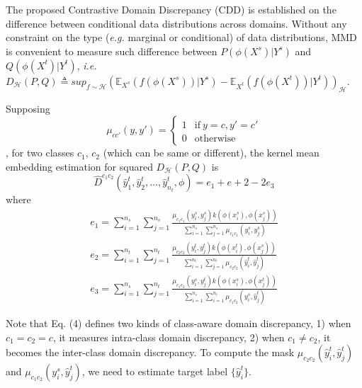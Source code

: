 \documentclass[conference]{IEEEtran}
\begin{document}
The proposed Contrastive Domain Discrepancy (CDD) is established on the difference between conditional data distributions across domains.
Without any constraint on the type (\textit{e.g.} marginal or conditional) of data distributions, MMD is convenient to measure such difference between
$P(\phi(X^s) | Y^s )$ and $Q(\phi(X^t) | Y^t)$, \textit{i.e.} $D_\mathcal{H}(P,Q) \triangleq sup_{f \sim \mathcal{H}}(\mathbb{E}_{X^s}(f(\phi(X^s))|Y^s)-\mathbb{E}_{X^t}(f(\phi(X^t))|Y^t))_\mathcal{H}$.

Supposing 
\begin{equation}
\mu_{cc'}(y,y') = 
\begin{cases}
   1 &\text{if}\ y=c, y'=c'\\
   0 &\text{otherwise}
\end{cases}
\end{equation}, for two classes $c_1$, $c_2$ (which can be same or different),
the kernel mean embedding estimation for squared $D_\mathcal{H}(P,Q)$ is 
\begin{equation}
    \hat{D}^{c_1c_2}(\hat{y}^t_1, \hat{y}^t_2, \ldots, \hat{y}^t_{n_t}, \phi) = e_1 + e+2 - 2e_3
\end{equation}
where 
\begin{equation}
    \begin{split}
e_1 = \sum_{i=1}^{n_s} \sum_{j=1}^{n_s} \frac{\mu_{c_1c_1} (y^s_i ,y^s_j ) k (\phi(x^s_i) ,\phi(x^s_j) )}{\sum_{i=1}^{n_s} \sum_{j=1}^{n_s} \mu_{c_1c_1}(y^s_i, y^s_j) }\\
e_2 = \sum_{i=1}^{n_t} \sum_{j=1}^{n_t} \frac{\mu_{c_2c_2} (y^t_i ,y^t_j ) k (\phi(x^t_i) ,\phi(x^s_j) )}{\sum_{i=1}^{n_t} \sum_{j=1}^{n_t} \mu_{c_2c_2}(\hat{y}^t_i, \hat{y}^t_j) }\\
e_3 = \sum_{i=1}^{n_s} \sum_{j=1}^{n_t} \frac{\mu_{c_1c_2} (y^s_i ,y^t_j ) k (\phi(x^s_i) ,\phi(x^t_j) )}{\sum_{i=1}^{n_s} \sum_{i=1}^{n_t} \mu_{c_1c_2}(y^s_i, \hat{y}^t_j) }
    \end{split}
\end{equation}

Note that Eq. (4) defines two kinds of class-aware domain discrepancy, 1) when $c_1 = c_2 = c$, it measures intra-class domain discrepancy,
2) when $c_1 \neq c_2$, it becomes the inter-class domain discrepancy. To compute the mask $\mu_{c_2 c_2}(\hat{y}_i^t, \hat{y}_j^t)$ and $\mu_{c_1 c_2}(y^s_i, \hat{y}_j^t)$, we need to estimate target label $\{ \hat{y}^t_i \}$.
\end{document}
